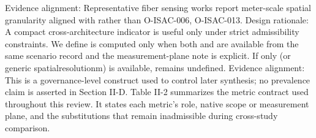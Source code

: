 {}Evidence alignment: Representative fiber sensing works report meter-scale spatial granularity aligned with  rather than  O-ISAC-006, O-ISAC-013.\markdownRendererInterblockSeparator
{}
\markdownRendererSectionEnd \markdownRendererSectionBegin
{}\markdownRendererInterblockSeparator
{}Design rationale: A compact cross-architecture indicator is useful only under strict admissibility constraints.\markdownRendererParagraphSeparator
{}We define\markdownRendererSoftLineBreak
{}\markdownRendererSoftLineBreak
{} is computed only when both  and  are available from the same scenario record and the measurement-plane note is explicit. If only  (or generic spatial\markdownRendererUnderscore{}resolution\markdownRendererUnderscore{}m) is available,  remains undefined.\markdownRendererParagraphSeparator
{}Evidence alignment: This is a governance-level construct used to control later synthesis; no prevalence claim is asserted in Section II-D.\markdownRendererParagraphSeparator
{}Table II-2 summarizes the metric contract used throughout this review. It states each metric's role, native scope or measurement plane, and the substitutions that remain inadmissible during cross-study comparison.\markdownRendererParagraphSeparator
{}\markdownRendererInterblockSeparator
